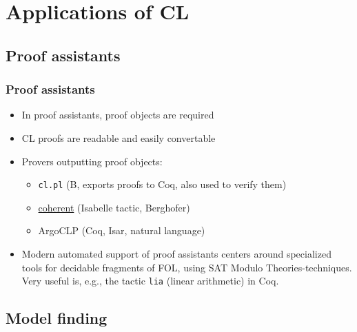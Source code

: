 \documentclass[handout,11pt]{beamer}
\begin{document}
\section{Applications of CL}

\subsection{Proof assistants}

\begin{frame}
\frametitle{Proof assistants}
 \begin{itemize}[<+->]   %
    \item In proof assistants, proof objects are required
    \item CL proofs are readable and easily convertable
    \item Provers outputting proof objects:
    \begin{itemize}
       \item \texttt{cl.pl} (B, exports proofs to Coq, also used
       to verify them)
       \item \url{coherent} (Isabelle tactic, Berghofer)
       \item ArgoCLP (Coq, Isar, natural language)
    \end{itemize}
    \item Modern automated support of proof assistants centers
    around specialized tools for decidable fragments of FOL,
    using SAT Modulo Theories-techniques. Very useful is, e.g.,
    the tactic \texttt{lia} (linear arithmetic) in Coq.   
 \end{itemize}
\end{frame}

\subsection{Model finding}
\end{document}

